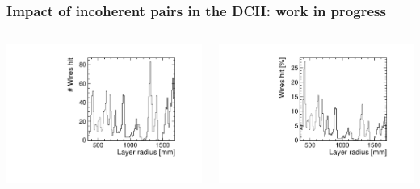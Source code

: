 \documentclass[aspectratio=169, hyperref={colorlinks=true,pdfpagelabels=false,linkcolor=black}, xcolor=dvipsnames,10pt]{beamer}
\begin{document}
\begin{frame}
	\frametitle{Impact of incoherent pairs in the DCH: work in progress}



	\begin{columns}
	\centering
	\includegraphics[width=\textwidth]{../figures/layerR_vs_wires.pdf}

	\centering
	\includegraphics[width=\textwidth]{../figures/layerR_vs_wires_percent.pdf}	
	
	\end{columns}
	
\end{frame}


\end{document}
